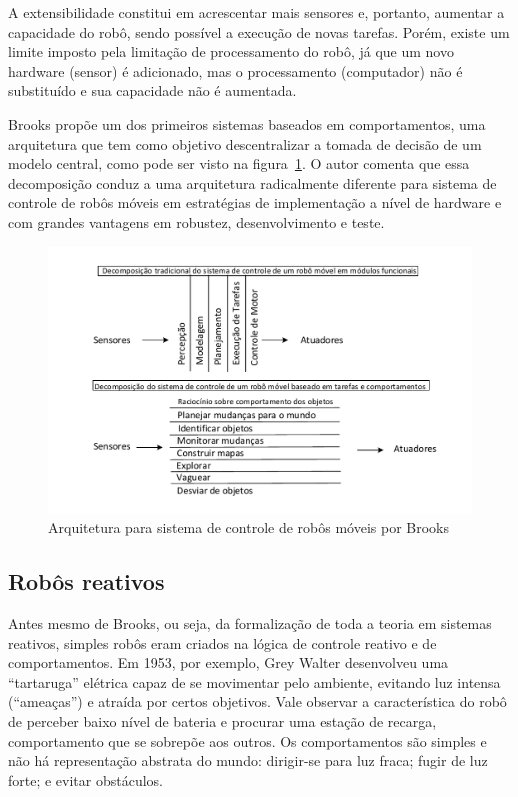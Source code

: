 A extensibilidade constitui em acrescentar mais sensores e,
portanto, aumentar a capacidade do robô, sendo possível a execução de novas
tarefas. Porém, existe um limite imposto pela limitação
de processamento do robô, já que um novo hardware (sensor) é adicionado, mas o
processamento (computador) não é substituído e sua capacidade não é aumentada.

Brooks propõe um dos primeiros sistemas baseados em comportamentos, uma
arquitetura que tem como objetivo descentralizar a tomada de decisão de um
modelo central, como pode ser visto na figura~\ref{BROOKS_1}. O autor comenta
que essa decomposição conduz a uma arquitetura radicalmente diferente para
sistema de controle de robôs móveis em estratégias de implementação a nível de
hardware e com grandes vantagens em robustez, desenvolvimento e teste.

\begin{figure}[H]
\centering
\includegraphics[width=1\columnwidth]{figs/BROOKS_1.pdf}
\caption{Arquitetura para sistema de controle de robôs móveis por Brooks}
\label{BROOKS_1}
\end{figure}

\subsection{Robôs reativos}
Antes mesmo de Brooks, ou seja, da formalização de toda a teoria em sistemas
reativos, simples robôs eram criados na lógica de controle reativo e de
comportamentos. Em 1953, por exemplo, Grey Walter \cite{holland1997grey}
desenvolveu uma ``tartaruga'' elétrica capaz de se movimentar pelo ambiente,
evitando luz intensa (``ameaças'') e atraída por certos objetivos. Vale
observar a característica do robô de perceber baixo nível de bateria e procurar
uma estação de recarga, comportamento que se sobrepõe aos outros. Os
comportamentos são simples e não há representação abstrata do mundo:
dirigir-se para luz fraca; fugir de luz forte; e evitar obstáculos.

